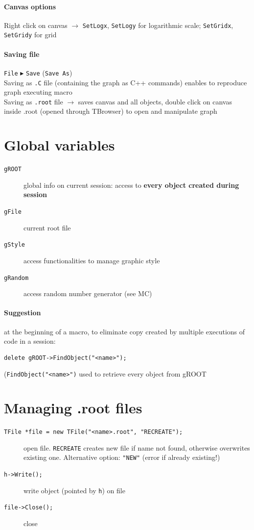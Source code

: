 \documentclass[10pt, oneside]{article}
\begin{document}
\paragraph{Canvas options} Right click on canvas $\rightarrow$ \texttt{SetLogx}, \texttt{SetLogy} for logarithmic scale; \texttt{SetGridx}, \texttt{SetGridy} for grid
\paragraph{Saving file} \texttt{File} $\blacktriangleright$ \texttt{Save} (\texttt{Save As})
\\Saving as \texttt{.C} file (containing the graph as C++ commands) enables to reproduce graph executing macro
\\Saving as \texttt{.root} file $\rightarrow$ saves canvas and all objects, double click on canvas inside .root (opened through TBrowser) to open and manipulate graph

\section{Global variables}
\begin{description}
\item[\texttt{gROOT}] global info on current session: access to \textbf{every object created during session}
\item[\texttt{gFile}] current root file
\item[\texttt{gStyle}] access functionalities to manage graphic style
\item[\texttt{gRandom}] access random number generator (see MC)
\end{description}
\paragraph{Suggestion} at the beginning of a macro, to eliminate copy created by multiple executions of code in a session:
\begin{verbatim}
delete gROOT->FindObject("<name>");
\end{verbatim}
(\texttt{FindObject("<name>")} used to retrieve every object from gROOT

\section{Managing .root files}
\begin{description}
\item[\texttt{TFile *file = new TFile("<name>.root", "RECREATE");}] open file. \texttt{RECREATE} creates new file if name not found, otherwise overwrites existing one. Alternative option: \texttt{"NEW"} (error if already existing!)
\item[\texttt{h->Write();}] write object (pointed by \texttt{h}) on file
\item[\texttt{file->Close();}] close
\end{description}
\end{document}
